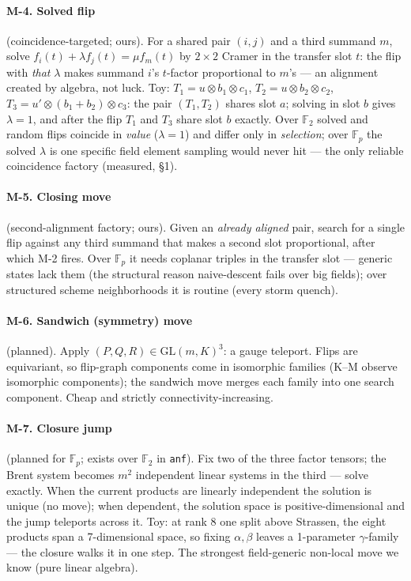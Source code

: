 \documentclass[10pt]{article}
\begin{document}
\paragraph{M-4. Solved flip} (coincidence-targeted; ours). For a
shared pair $(i,j)$ and a third summand $m$, solve
$f_i(t) + \lambda f_j(t) = \mu f_m(t)$ by $2{\times}2$ Cramer in
the transfer slot $t$: the flip with \emph{that} $\lambda$ makes
summand $i$'s $t$-factor proportional to $m$'s --- an alignment
created by algebra, not luck. Toy: $T_1 = u\otimes b_1\otimes c_1$,
$T_2 = u\otimes b_2\otimes c_2$,
$T_3 = u'\otimes(b_1{+}b_2)\otimes c_3$: the pair $(T_1,T_2)$
shares slot $a$; solving in slot $b$ gives $\lambda = 1$, and after
the flip $T_1$ and $T_3$ share slot $b$ exactly. Over
$\mathbb{F}_2$ solved and random flips coincide in \emph{value}
($\lambda = 1$) and differ only in \emph{selection}; over
$\mathbb{F}_p$ the solved $\lambda$ is one specific field element
sampling would never hit --- the only reliable coincidence factory
(measured, \S1).

\paragraph{M-5. Closing move} (second-alignment factory; ours).
Given an \emph{already aligned} pair, search for a single flip
against any third summand that makes a second slot proportional,
after which M-2 fires. Over $\mathbb{F}_p$ it needs coplanar
triples in the transfer slot --- generic states lack them (the
structural reason naive-descent fails over big fields); over
structured scheme neighborhoods it is routine (every storm
quench).

\paragraph{M-6. Sandwich (symmetry) move} (planned). Apply
$(P,Q,R) \in \mathrm{GL}(m,K)^3$: a gauge teleport. Flips are
equivariant, so flip-graph components come in isomorphic families
(K--M observe isomorphic components); the sandwich move merges each
family into one search component. Cheap and strictly
connectivity-increasing.

\paragraph{M-7. Closure jump} (planned for $\mathbb{F}_p$; exists
over $\mathbb{F}_2$ in \texttt{anf}). Fix two of the three factor
tensors; the Brent system becomes $m^2$ independent linear systems
in the third --- solve exactly. When the current products are
linearly independent the solution is unique (no move); when
dependent, the solution space is positive-dimensional and the jump
teleports across it. Toy: at rank 8 one split above Strassen, the
eight products span a 7-dimensional space, so fixing
$\alpha,\beta$ leaves a 1-parameter $\gamma$-family --- the closure
walks it in one step. The strongest field-generic non-local move
we know (pure linear algebra).
\end{document}
